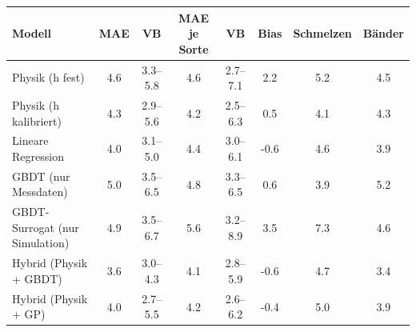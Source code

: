 \begin{tabular}{@{}lS[table-format=1.1]cS[table-format=1.1]cS[table-format=-1.1]S[table-format=1.1]S[table-format=1.1]@{}}
\toprule
Modell & {MAE} & {VB} & {MAE je Sorte} & {VB} & {Bias} & {Schmelzen} & {Bänder} \\
\midrule
Physik (h fest) & 4.6 & \numrange{3.3}{5.8} & 4.6 & \numrange{2.7}{7.1} & 2.2 & 5.2 & 4.5 \\
Physik (h kalibriert) & 4.3 & \numrange{2.9}{5.6} & 4.2 & \numrange{2.5}{6.3} & 0.5 & 4.1 & 4.3 \\
Lineare Regression & 4.0 & \numrange{3.1}{5.0} & 4.4 & \numrange{3.0}{6.1} & -0.6 & 4.6 & 3.9 \\
GBDT (nur Messdaten) & 5.0 & \numrange{3.5}{6.5} & 4.8 & \numrange{3.3}{6.5} & 0.6 & 3.9 & 5.2 \\
GBDT-Surrogat (nur Simulation) & 4.9 & \numrange{3.5}{6.7} & 5.6 & \numrange{3.2}{8.9} & 3.5 & 7.3 & 4.6 \\
Hybrid (Physik + GBDT) & 3.6 & \numrange{3.0}{4.3} & 4.1 & \numrange{2.8}{5.9} & -0.6 & 4.7 & 3.4 \\
Hybrid (Physik + GP) & 4.0 & \numrange{2.7}{5.5} & 4.2 & \numrange{2.6}{6.2} & -0.4 & 5.0 & 3.9 \\
\bottomrule
\end{tabular}
